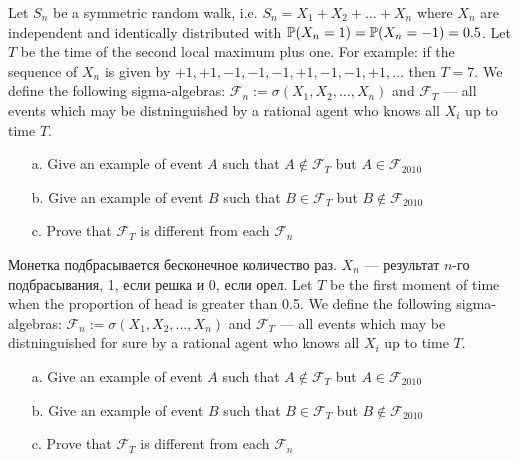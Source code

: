 \begin{solution}
\begin{problem}
Let $ S_{n} $ be a symmetric random walk, i.e. $ S_{n}=X_{1}+X_{2}+\ldots+X_{n} $ where $ X_{n} $ are independent and identically distributed with $ \P(X_{n}=1)=\P(X_{n}=-1)=0.5 $. Let $T$ be the time of the second local maximum plus one. For example: if the sequence of $ X_{n} $ is given by $ +1,+1,-1,-1,-1,+1,-1,-1,+1,\ldots $ then $ T= 7$. We define the following sigma-algebras: $ \mathcal{F}_{n}:=\sigma(X_{1},X_{2},\ldots,X_{n})$ and $ \mathcal{F}_{T} $ --- all events which may be distninguished by a rational agent who knows all $ X_{i} $ up to time $ T $. 
\begin{itemize}
\item[a.] Give an example of event $A$ such that $ A\notin \mathcal{F}_{T} $ but $ A\in \mathcal{F}_{2010} $
\item[b.] Give an example of event $B$ such that $ B\in \mathcal{F}_{T} $ but $ B\notin \mathcal{F}_{2010} $
\item[c.] Prove that $ \mathcal{F}_{T} $ is different from each $ \mathcal{F}_{n} $
\end{itemize}

\end{problem} 
\begin{solution} 

\end{solution}

\begin{problem}
Монетка подбрасывается бесконечное количество раз. $ X_{n} $ --- результат $ n $-го подбрасывания, 1, если решка и 0, если орел. Let $T$ be the first moment of time when the proportion of head is greater than 0.5. We define the following sigma-algebras: $ \mathcal{F}_{n}:=\sigma(X_{1},X_{2},\ldots,X_{n})$ and $ \mathcal{F}_{T} $ --- all events which may be distninguished for sure by a rational agent who knows all $ X_{i} $ up to time $ T $. 
\begin{itemize}
\item[a.] Give an example of event $A$ such that $ A\notin \mathcal{F}_{T} $ but $ A\in \mathcal{F}_{2010} $
\item[b.] Give an example of event $B$ such that $ B\in \mathcal{F}_{T} $ but $ B\notin \mathcal{F}_{2010} $
\item[c.] Prove that $ \mathcal{F}_{T} $ is different from each $ \mathcal{F}_{n} $
\end{itemize}

\end{problem} 
\begin{solution} 


\end{solution}
\end{solution}
